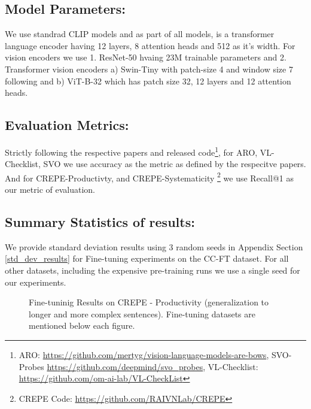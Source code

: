 \documentclass[11pt]{article}
\begin{document}
\subsection{Model Parameters:} We use standrad CLIP models and as part of all models, is a transformer language encoder having 12 layers, 8 attention heads and 512 as it's width. For vision encoders we use 1. ResNet-50 hvaing 23M trainable parameters and 2. Transformer vision encoders a) Swin-Tiny with patch-size 4 and window size 7 following \citep{yang2022unified} and b) ViT-B-32 which has patch size 32, 12 layers and 12 attention heads.

\subsection{Evaluation Metrics:} Strictly following the respective papers and released code\footnote{ARO: \url{https://github.com/mertyg/vision-language-models-are-bows}, SVO-Probes \url{https://github.com/deepmind/svo_probes}, VL-Checklist: \url{https://github.com/om-ai-lab/VL-CheckList}}, for ARO, VL-Checklist, SVO we use accuracy as the metric as defined by the respecitve papers. And for CREPE-Productivty, and CREPE-Systematicity \footnote{CREPE Code: \url{https://github.com/RAIVNLab/CREPE}} we use Recall@1 as our metric of evaluation.

\subsection{Summary Statistics of results:} We provide standard deviation results using 3 random seeds in Appendix Section \ref{std_dev_results} for Fine-tuning experiments on the CC-FT dataset. For all other datasets, including the expensive pre-training runs we use a single seed for our experiments.

\newpage
\begin{figure}[h!]
    \centering
    \hfill
    \caption{Fine-tuninig Results on {\color{blue} CREPE - Productivity} (generalization to longer and more complex sentences). Fine-tuning datasets are mentioned below each figure.}
    \label{fig:Productivity_clip_ft_cc_coo}
\end{figure}
\end{document}
